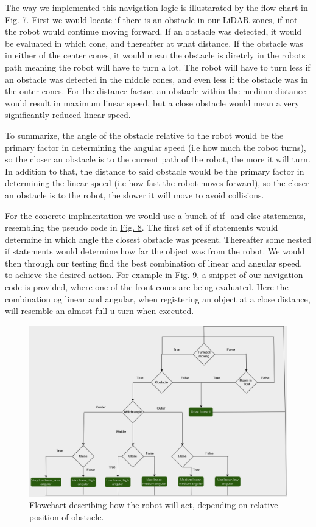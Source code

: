 \documentclass[conference]{IEEEtran}
\begin{document}
The way we implemented this navigation logic is illustarated by the flow chart in \href{sec:flowchart}{Fig. 7}. 
First we would locate if there is an obstacle in our LiDAR zones, if not the robot would continue moving forward.
If an obstacle was detected, it would be evaluated in which cone, and thereafter at what distance.
If the obstacle was in either of the center cones, it would mean the obstacle is diretcly in the robots path meaning the robot will have to turn a lot.
The robot will have to turn less if an obstacle was detected in the middle cones, and even less if the obstacle was in the outer cones.
For the distance factor, an obstacle within the medium distance would result in maximum linear speed, but a close obstacle would mean a very significantly reduced linear speed.

To summarize, the angle of the obstacle relative to the robot would be the primary factor in determining the angular speed (i.e how much the robot turns), so the closer an obstacle is to the current path of the robot, the more it will turn.
In addition to that, the distance to said obstacle would be the primary factor in determining the linear speed (i.e how fast the robot moves forward), so the closer an obstacle is to the robot, the slower it will move to avoid collisions.


For the concrete implmentation we would use a bunch of if- and else statements, resembling the pseudo code in \href{sec:pseudo}{Fig. 8}.
The first set of if statements would determine in which angle the closest obstacle was present.
Thereafter some nested if statements would determine how far the object was from the robot.
We would then through our testing find the best combination of linear and angular speed, to achieve the desired action.
For example in \href{sec:navigation}{Fig. 9}, a snippet of our navigation code is provided, where one of the front cones are being evaluated. 
Here the combination og linear and angular, when registering an object at a close distance, will resemble an almost full u-turn when executed.

\begin{figure}[h]
    \centerline{\includegraphics[width=1.0\columnwidth]{Pictures/Flowchart.png}}
    \caption{Flowchart describing how the robot will act, depending on relative position of obstacle.}
    \label{sec:flowchart}
    \end{figure}
\end{document}
